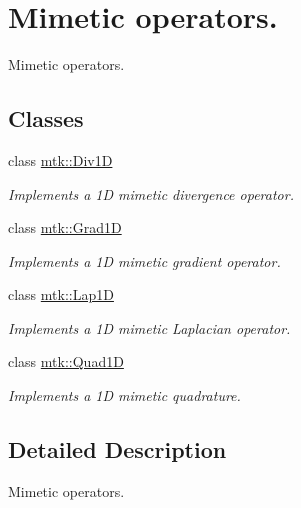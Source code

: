 \hypertarget{group__c07-mim__ops}{\section{Mimetic operators.}
\label{group__c07-mim__ops}
}


Mimetic operators.  


\subsection*{Classes}
\begin{DoxyCompactItemize}
\item 
class \hyperlink{classmtk_1_1Div1D}{mtk\-::\-Div1\-D}
\begin{DoxyCompactList}\small\item\em Implements a 1\-D mimetic divergence operator. \end{DoxyCompactList}\item 
class \hyperlink{classmtk_1_1Grad1D}{mtk\-::\-Grad1\-D}
\begin{DoxyCompactList}\small\item\em Implements a 1\-D mimetic gradient operator. \end{DoxyCompactList}\item 
class \hyperlink{classmtk_1_1Lap1D}{mtk\-::\-Lap1\-D}
\begin{DoxyCompactList}\small\item\em Implements a 1\-D mimetic Laplacian operator. \end{DoxyCompactList}\item 
class \hyperlink{classmtk_1_1Quad1D}{mtk\-::\-Quad1\-D}
\begin{DoxyCompactList}\small\item\em Implements a 1\-D mimetic quadrature. \end{DoxyCompactList}\end{DoxyCompactItemize}


\subsection{Detailed Description}
Mimetic operators. 